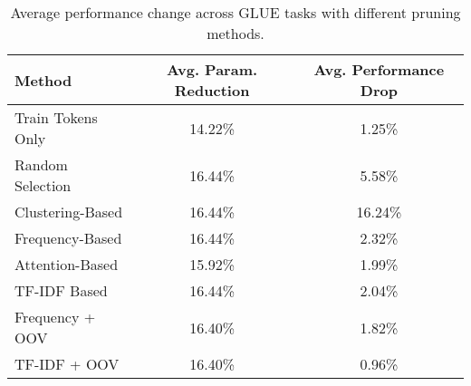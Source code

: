 \documentclass[twocolumn]{article}
\begin{document}
\begin{table}[ht!]
\centering
\caption{Average performance change across GLUE tasks with different pruning methods.}
\label{tab:avg_performance}
\begin{tabular}{lcc}
\toprule
\textbf{Method} & \textbf{Avg. Param. Reduction} & \textbf{Avg. Performance Drop} \\
\midrule
Train Tokens Only & 14.22\% & 1.25\% \\
Random Selection & 16.44\% & 5.58\% \\
Clustering-Based & 16.44\% & 16.24\% \\
Frequency-Based & 16.44\% & 2.32\% \\
Attention-Based & 15.92\% & 1.99\% \\
TF-IDF Based & 16.44\% & 2.04\% \\
Frequency + OOV & 16.40\% & 1.82\% \\
TF-IDF + OOV & 16.40\% & 0.96\% \\
\bottomrule
\end{tabular}
\end{table}
\end{document}
